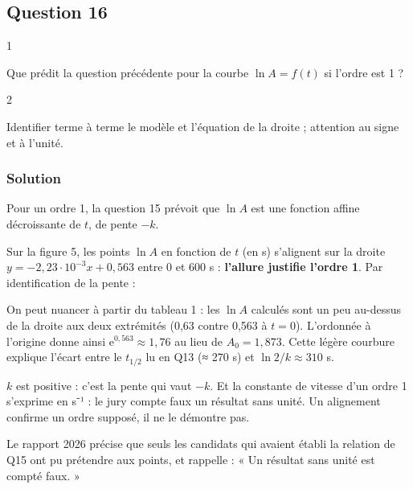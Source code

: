 \documentclass[11pt,a4paper]{article}
\newcommand{\equationajustee}[1]{%
  \sbox{\boiteequation}{$\displaystyle #1$}%
  \ifdim\wd\boiteequation>\linewidth
    \[\resizebox{\linewidth}{!}{\usebox{\boiteequation}}\]%
  \else
    \[#1\]%
  \fi}
\begin{document}
\hypertarget{question-16}{%
\subsection{Question 16}\label{question-16}}

\begin{indication}{1}

Que prédit la question précédente pour la courbe \(\ln A=f(t)\) si l'ordre est 1 ?

\end{indication}

\begin{indication}{2}

Identifier terme à terme le modèle et l'équation de la droite ; attention au signe et à l'unité.

\end{indication}

\hypertarget{solution-15}{%
\subsubsection{Solution}\label{solution-15}}

Pour un ordre 1, la question 15 prévoit que \(\ln A\) est une fonction affine décroissante de \(t\), de pente \(-k\).

Sur la figure 5, les points \(\ln A\) en fonction de \(t\) (en s) s'alignent sur la droite \(y=-2{,}23\cdot10^{-3}x+0{,}563\) entre 0 et 600 s : \textbf{l'allure justifie l'ordre 1}. Par identification de la pente :

\equationajustee{\boxed{k=2{,}23\cdot10^{-3}\ \mathrm{s^{-1}}}}

On peut nuancer à partir du tableau 1 : les \(\ln A\) calculés sont un peu au-dessus de la droite aux deux extrémités (0,63 contre 0,563 à \(t=0\)). L'ordonnée à l'origine donne ainsi \({\mathrm{e}}^{0{,}563}\approx1{,}76\) au lieu de \(A_0=1{,}873\). Cette légère courbure explique l'écart entre le \(t_{1/2}\) lu en Q13 (≈ 270 s) et \(\ln2/k\approx310\) s.

\begin{piege}

\(k\) est positive : c'est la pente qui vaut \(-k\). Et la constante de vitesse d'un ordre 1 s'exprime en s⁻¹ : le jury compte faux un résultat sans unité. Un alignement confirme un ordre supposé, il ne le démontre pas.

\end{piege}

\begin{jury}

Le rapport 2026 précise que seuls les candidats qui avaient établi la relation de Q15 ont pu prétendre aux points, et rappelle : « Un résultat sans unité est compté faux. »

\end{jury}
\end{document}
